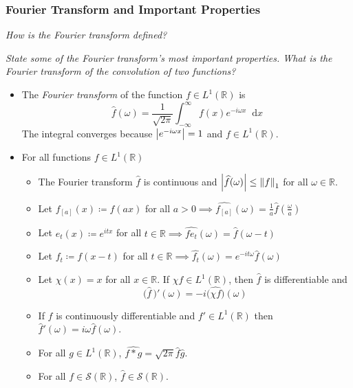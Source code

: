 \documentclass[11pt, a4paper]{article}
\newcommand{\question}[1]{\textit{#1}\vspace{2mm}}
\newcommand{\R}{\mathbb{R}} %
\newcommand{\diff}{\mathop{}\!\mathrm{d}} %
\begin{document}
\subsubsection{Fourier Transform and Important Properties}
\question{How is the Fourier transform defined?}

\question{State some of the Fourier transform's most important properties. What is the Fourier transform of the convolution of two functions?}


\begin{itemize}
	\item The \textit{Fourier transform} of the function $ f \in L^{1}(\R) $ is
	\begin{equation*}
		\widehat{f}(\omega) = \frac{1}{\sqrt{2\pi}} \int_{-\infty}^{\infty} f(x)e^{-i\omega x} \diff x
	\end{equation*}
	The integral converges because $ \abs{e^{-i\omega x}} = 1 $ and $ f \in L^{1}(\R) $.
	
	\item For all functions $ f \in L^{1}(\R) $
	\begin{itemize}
		\item The Fourier transform $ \widehat{f} $ is continuous and $ \abs{\widehat{f}(\omega)} \leq \norm{f}_{1} $ for all $ \omega \in \R $.
		
		\item Let $ f_{[a]}(x) \coloneqq f(ax) $ for all $ a > 0 \implies \displaystyle{\widehat{f_{[a]}}(\omega) = \frac{1}{a}\widehat{f}\left(\frac{\omega}{a} \right)} $
		
		\item Let $ e_{t}(x) \coloneqq e^{itx} $ for all $ t \in \R \implies \displaystyle{\widehat{fe_t}(\omega) = \widehat{f}(\omega - t)} $
		

		\item Let $ f_t \coloneqq f(x - t) $ for all $ t \in \R \implies \displaystyle{\widehat{f_{t}}(\omega) = e^{-it\omega} \widehat{f}(\omega)} $
		
		\item Let $ \chi(x) = x $ for all $ x \in \R $. If $ \chi f \in L^{1}(\R) $, then $ \widehat{f} $ is differentiable and 
		\begin{equation*}
		\big( \widehat{f} \, \big)'(\omega) = -i \big( \widehat{\chi f}\big)(\omega)
		\end{equation*}
		\vspace{-7mm}
		
		\item If $ f $ is continuously differentiable and $ f' \in L^{1}(\R) $ then $ \widehat{f}'(\omega) = i \omega \widehat{f}(\omega) $.
		
		\item For all $ g \in L^{1}(\R) $, $ \displaystyle{\widehat{f*g} = \sqrt{2\pi} \widehat{f} \widehat{g}} $.
		
		\item For all $ f \in \mathcal{S}(\R) $, $ \widehat{f} \in \mathcal{S}(\R) $.
	\end{itemize}
	
\end{itemize}
\end{document}
